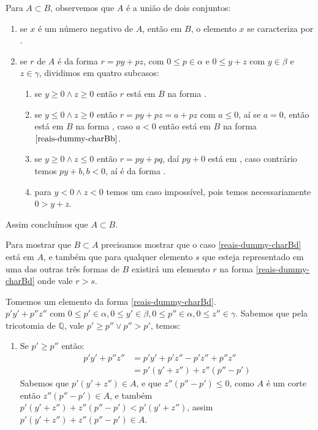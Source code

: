 \documentclass[../main.tex]{subfiles}
\begin{document}
\begin{dem}
    Para $ A \subset B$, observemos que $A$ é a união de dois conjuntos:
    \begin{enumerate}
        \item se $x$ é um número negativo de $A$, então em $B$, o elemento $x$ se caracteriza por .
        \item {se $r$ de $A$ é da forma $r = py + pz$, com $0 \leq p \in \alpha$ e $0 \leq y+z$ com $y \in \beta$ e $z \in \gamma$, dividimos em quatro subcasos:
            \begin{enumerate}
                \item se $y \geq 0 \land z \geq 0$ então $r$ está em $B$ na forma .
                \item se $y \leq 0 \land z \geq 0$ então $r = py+pz = a + pz$ com $a \leq 0$, aí se $a=0$, então está em $B$ na forma , caso $a < 0$ então está em $B$ na forma $\Cref{reais-dummy-charBb}$.
                \item se $y \geq 0 \land z \leq 0$ então $r = py + pq$, daí $py + 0$ está em , caso contrário temos $py + b, b< 0$, aí é da forma .
                \item para $y < 0 \land z < 0$ temos um caso impossível, pois temos necessariamente $0 > y+z$.
            \end{enumerate}
        }
    \end{enumerate}

    Assim concluímos que $A \subset B$.

    Para mostrar que $B \subset A$ precisamos mostrar que o caso \ref{reais-dummy-charBd} está em $A$, e também que para qualquer elemento $s$ que esteja representado em uma das outras três formas de $B$ existirá um elemento $r$ na forma \ref{reais-dummy-charBd} onde vale $r > s$.  
    
    Tomemos um elemento da forma \ref{reais-dummy-charBd}. \\
    $p'y' + p''z''$ com $0 \leq p' \in \alpha, 0 \leq y' \in \beta, 0 \leq p'' \in \alpha, 0 \leq z'' \in \gamma$. 
        Sabemos que pela tricotomia de $\mathbb{Q}$, vale $p' \geq p'' \lor p'' > p'$, temos:\\
        \begin{enumerate}
            \item Se $p' \geq p''$ então:
                \begin{align}
                    p'y' + p''z'' &= p'y' + p'z'' - p'z'' + p''z'' \\
                    &= p'(y' + z'') + z''(p''-p') 
                \end{align}
                Sabemos que $p'(y' + z'') \in A$, e que $z''(p''-p') \leq 0$, como $A$ é um corte então $z''(p''-p') \in A$, e também $p'(y' + z'')+z''(p''-p') < p'(y' + z'')$, assim $p'(y' + z'') + z''(p''-p') \in A$.
        

\end{enumerate}
\end{dem}
\end{document}
